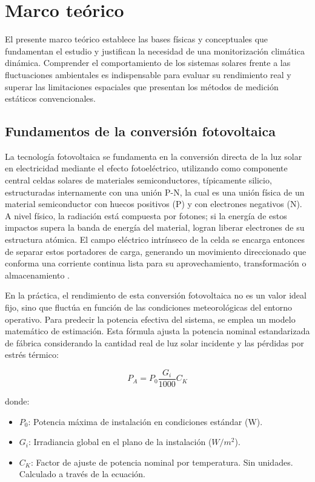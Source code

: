 \documentclass[../../General.tex]{subfiles}
\begin{document}
\section{Marco teórico}

El presente marco teórico establece las bases físicas y conceptuales que fundamentan el estudio y justifican la necesidad de una monitorización climática dinámica. Comprender el comportamiento de los sistemas solares frente a las fluctuaciones ambientales es indispensable para evaluar su rendimiento real y superar las limitaciones espaciales que presentan los métodos de medición estáticos convencionales.

\subsection{Fundamentos de la conversión fotovoltaica}
La tecnología fotovoltaica se fundamenta en la conversión directa de la luz solar en electricidad mediante el efecto fotoeléctrico, utilizando como componente central celdas solares de materiales semiconductores, típicamente silicio, estructuradas internamente con una unión P-N, la cual es una unión física de un material semiconductor con huecos positivos (P) y con electrones negativos (N). A nivel físico, la radiación está compuesta por fotones; si la energía de estos impactos supera la banda de energía del material, logran liberar electrones de su estructura atómica. El campo eléctrico intrínseco de la celda se encarga entonces de separar estos portadores de carga, generando un movimiento direccionado que conforma una corriente continua lista para su aprovechamiento, transformación o almacenamiento \citep{martinez2018estimation}.

En la práctica, el rendimiento de esta conversión fotovoltaica no es un valor ideal fijo, sino que fluctúa en función de las condiciones meteorológicas del entorno operativo. Para predecir la potencia efectiva del sistema, se emplea un modelo matemático de estimación. Esta fórmula ajusta la potencia nominal estandarizada de fábrica considerando la cantidad real de luz solar incidente y las pérdidas por estrés térmico:

\begin{equation}
    P_{A} = P_{0} \frac{G_{i}}{1000} C_{K}
\end{equation}

donde:
\begin{itemize}
    \item $P_{0}$: Potencia máxima de instalación en condiciones estándar (W).
    \item $G_{i}$: Irradiancia global en el plano de la instalación ($W/m^{2}$).
    \item $C_{K}$: Factor de ajuste de potencia nominal por temperatura. Sin unidades. Calculado a través de la ecuación.
\end{itemize}
\end{document}
